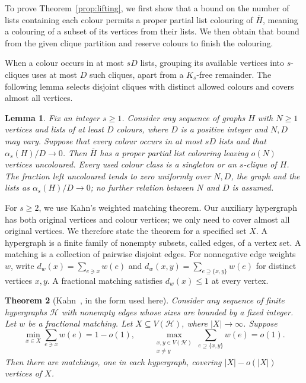 \documentclass[11pt]{article}
\newtheorem{theorem}{Theorem}[section]
\newtheorem{lemma}[theorem]{Lemma}
\numberwithin{equation}{section}
\newcommand{\ov}[1]{\overline{#1}}
\begin{document}
To prove Theorem~\ref{prop:lifting}, we first show that a bound on the number of lists containing each colour permits a proper partial list colouring of $\ov H$, meaning a colouring of a subset of its vertices from their lists. We then obtain that bound from the given clique partition and reserve colours to finish the colouring.

When a colour occurs in at most $sD$ lists, grouping its available vertices into $s$-cliques uses at most $D$ such cliques, apart from a $K_s$-free remainder. The following lemma selects disjoint cliques with distinct allowed colours and covers almost all vertices.

\begin{lemma}\label{lem:partial}
Fix an integer $s\ge1$. Consider any sequence of graphs $H$ with $N\ge1$ vertices and lists of at least $D$ colours, where $D$ is a positive integer and $N,D$ may vary. Suppose that every colour occurs in at most $sD$ lists and that $\alpha_s(H)/D\to0$. Then $\ov H$ has a proper partial list colouring leaving $o(N)$ vertices uncoloured. Every used colour class is a singleton or an $s$-clique of $H$. The fraction left uncoloured tends to zero uniformly over $N,D$, the graph and the lists as $\alpha_s(H)/D\to0$; no further relation between $N$ and $D$ is assumed.
\end{lemma}

For $s\ge2$, we use Kahn's weighted matching theorem. Our auxiliary hypergraph has both original vertices and colour vertices; we only need to cover almost all original vertices. We therefore state the theorem for a specified set $X$. A hypergraph is a finite family of nonempty subsets, called edges, of a vertex set. A matching is a collection of pairwise disjoint edges. For nonnegative edge weights $w$, write $d_w(x)=\sum_{e\ni x}w(e)$ and $d_w(x,y)=\sum_{e\supseteq\{x,y\}}w(e)$ for distinct vertices $x,y$. A fractional matching satisfies $d_w(x)\le1$ at every vertex.

\begin{theorem}[Kahn~{\cite[Theorem~1.5]{KahnLP}}, in the form used here]
\label{thm:kahn}
Consider any sequence of finite hypergraphs $\mathcal H$ with nonempty edges whose sizes are bounded by a fixed integer. Let $w$ be a fractional matching. Let $X\subseteq V(\mathcal H)$, where $|X|\to\infty$. Suppose
\[
 \min_{x\in X}\sum_{e\ni x}w(e)=1-o(1),
 \qquad
 \max_{\substack{x,y\in V(\mathcal H)\\x\ne y}}
      \sum_{e\supseteq\{x,y\}}w(e)=o(1).
\]
Then there are matchings, one in each hypergraph, covering $|X|-o(|X|)$ vertices of $X$.
\end{theorem}
\end{document}
